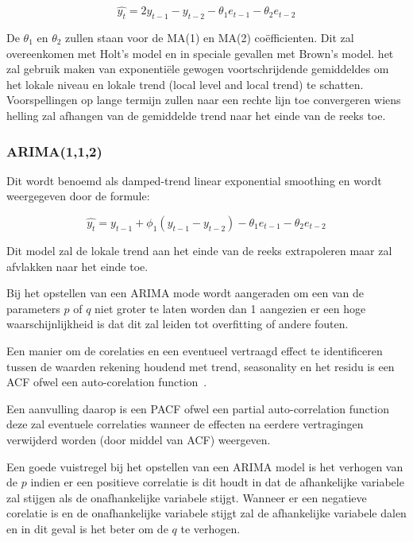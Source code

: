 \begin{equation}
\hat{y_t} = 2y_{t-1} - y_{t-2} - \theta_1 e_{t-1} - \theta_2 e_{t-2}
\end{equation}

De $\theta_1$ en $\theta_2$ zullen staan voor de MA(1) en MA(2) co\"{e}fficienten. Dit zal overeenkomen met Holt's model en in speciale gevallen met Brown's model. het zal gebruik maken van exponenti\"{e}le gewogen voortschrijdende gemiddeldes om het lokale niveau en lokale trend (local level and local trend) te schatten. Voorspellingen op lange termijn zullen naar een rechte lijn toe convergeren wiens helling zal afhangen van de gemiddelde trend naar het einde van de reeks toe. 

\subsubsection{ARIMA(1,1,2)}

Dit wordt benoemd als damped-trend linear exponential smoothing en wordt weergegeven door de formule:

\begin{equation}
\hat{y_t} = y_{t-1} + \phi_1 (y_{t-1} - y_{t-2}) - \theta_1 e_{t-1} - \theta_2 e_{t-2}
\end{equation}

Dit model zal de lokale trend aan het einde van de reeks extrapoleren maar zal afvlakken naar het einde toe. 

Bij het opstellen van een ARIMA mode wordt aangeraden om een van de parameters $p$ of $q$ niet groter te laten worden dan 1 aangezien er een hoge waarschijnlijkheid is dat dit zal leiden tot overfitting of andere fouten.

Een manier om de corelaties en een eventueel vertraagd effect te identificeren tussen de waarden rekening houdend met trend, seasonality en het residu is een ACF ofwel een auto-corelation function~\autocite{Salvi2020}.

Een aanvulling daarop is een PACF ofwel een partial auto-correlation function deze zal eventuele correlaties wanneer de effecten na eerdere vertragingen verwijderd worden (door middel van ACF) weergeven. 

Een goede vuistregel bij het opstellen van een ARIMA model is het verhogen van de $p$ indien er een positieve correlatie is dit houdt in dat de afhankelijke variabele zal stijgen als de onafhankelijke variabele stijgt. Wanneer er een negatieve corelatie is en de onafhankelijke variabele stijgt zal de afhankelijke variabele dalen en in dit geval is het beter om de $q$ te verhogen.

